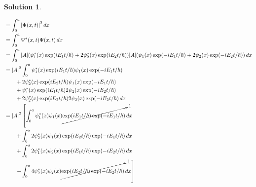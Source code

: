 \documentclass[10pt]{article}
\theoremstyle{definition}
\newtheorem{soln}{Solution}
\begin{document}
\begin{soln}
\begin{enumerate}[label=(\alph*)]
          \begin{align*}
             & =\int_{0}^{a}\abs{\Psi(x,t)}^2\,dx                                                                                                                    \\
             & =\int_{0}^{a}\Psi^*(x,t)\Psi(x,t)\,dx                                                                                                                 \\
             & =\int_{0}^{a}\abs{A}(\psi_1^*(x)\exp(iE_1t/\hbar)+2\psi_2^*(x)\exp(iE_2t/\hbar))\abs{A}(\psi_1(x)\exp(-iE_1t/\hbar)+2\psi_2(x)\exp(-iE_2t/\hbar))\,dx \\
             & =\abs{A}^2\int_{0}^{a}
            \psi_1^*(x)\exp(iE_1t/\hbar)\psi_1(x)\exp(-iE_1t/\hbar)                                                                                                  \\
             & \qquad+2\psi_2^*(x)\exp(iE_2t/\hbar)\psi_1(x)\exp(-iE_1t/\hbar)                                                                                       \\
             & \qquad+\psi_1^*(x)\exp(iE_1t/\hbar)2\psi_2(x)\exp(-iE_2t/\hbar)                                                                                       \\
             & \qquad+2\psi_2^*(x)\exp(iE_2t/\hbar)2\psi_2(x)\exp(-iE_2t/\hbar)
            \,dx                                                                                                                                                     \\
             & =\abs{A}^2\left[
            \int_{0}^{a}\psi_1^*(x)\psi_1(x)\cancelto{1}{\exp(iE_1t/\hbar)\exp(-iE_1t/\hbar)}\,dx\right.                                                             \\
             & \qquad+\int_{0}^{a}2\psi_2^*(x)\psi_1(x)\exp(iE_2t/\hbar)\exp(-iE_1t/\hbar)\,dx                                                                       \\
             & \qquad+\int_{0}^{a}2\psi_1^*(x)\psi_2(x)\exp(iE_1t/\hbar)\exp(-iE_2t/\hbar)\,dx                                                                       \\
             & \left.\qquad+\int_{0}^{a}4\psi_2^*(x)\psi_2(x)\cancelto{1}{\exp(iE_2t/\hbar)\exp(-iE_2t/\hbar)}
            \,dx\right]                                                                                                                                              \\

\end{align*}
\end{enumerate}
\end{soln}
\end{document}
